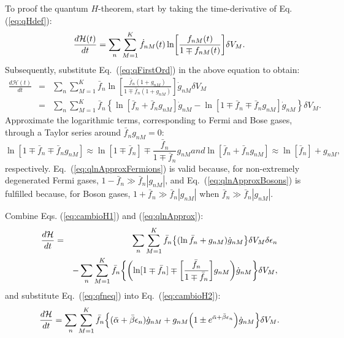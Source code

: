 To proof the quantum $H$-theorem, start by taking the time-derivative of Eq. (\ref{eq:qHdef}):
%
\begin{equation}\label{eq:deltaH}
   \frac{d \mathcal{H} (t)}{dt}= \sum_n \sum_{M=1}^{K} \dot{f}_{nM}(t)\ln \left[ \frac{f_{nM}(t)}{1\mp f_{nM}(t)} \right] \de V_M.
\end{equation}
%
Subsequently, substitute Eq.~(\ref{eq:qFirstOrd}) in the above equation to obtain:
%
\begin{eqnarray}\label{eq:cambioH1}
    \frac{d\mathcal{H} (t)}{dt}&=&
      \sum_n \sum_{M=1}^{K} \bar{f}_{n}\ln \left[
        \frac{\bar{f}_{n}(1+g_{nM})}{1\mp \bar{f}_{n} (1+ g_{nM})}
      \right]\dot{g}_{nM} \delta V_M \nonumber \\
    &=&\sum_n \sum_{M=1}^{K} \bar{f}_n \left \{
      \ln [\bar{f}_n+\bar{f}_n g_{nM}]\dot{g}_{nM}
      -\ln [1\mp\bar{f}_n\mp\bar{f}_n g_{nM}]\dot{g}_{nM}
    \right \}\delta V_M.
\end{eqnarray}
%
Approximate the logarithmic terms, corresponding to
Fermi and Bose gases, through a Taylor series around $\bar f_n g_{nM}=0$:
%
\begin{subequations}\label{eq:qlnApprox}
\begin{equation}\label{eq:qlnApproxFermions}
	\ln[1\mp\bar{f}_n\mp\bar{f}_n g_{nM}]
    	\approx \ln[1\mp\bar{f}_n]\mp\frac{\bar{f}_n}{1\mp\bar{f}_{n}} g_{nM}
\end{equation}
%
and
%
\begin{equation}\label{eq:qlnApproxBosons}
    \ln [\bar{f}_n+\bar{f}_n g_{nM}] \approx \ln [\bar{f}_n]+ g_{nM},
\end{equation}
\end{subequations}
%
respectively. Eq.~(\ref{eq:qlnApproxFermions}) is valid because, for non-extremely degenerated Fermi gases, 
$1-\bar{f}_n \gg \bar{f}_n|g_{nM}|$, and Eq.~(\ref{eq:qlnApproxBosons}) is fulfilled because,
for Boson gases,
$1+\bar{f}_n \gg \bar{f}_n |g_{nM}|$ when $\bar{f}_n \gg \bar{f}_n |g_{nM}|$.

Combine Eqs. (\ref{eq:cambioH1}) and (\ref{eq:qlnApprox}):
%
\begin{eqnarray}\label{eq:cambioH2}
    \frac{d\mathcal{H}}{dt}&=&\sum_n \sum_{M=1}^{K} \bar{f}_n\left \{ (\ln \bar{f}_n+ g_{nM})\dot{g}_{nM}\right\} \de V_M \delta \epsilon_n \nonumber \\
    &&-\sum_{n}\sum_{M=1}^{K}\bar f_n\left\{ \left( \ln[1\mp\bar{f}_n]\mp \left[\frac{\bar{f}_n}{1\mp\bar{f}_n} \right] g_{nM}\right)\dot{g}_{nM} \right \}\de V_M,
\end{eqnarray}
%
and substitute Eq.~(\ref{eq:qfneq}) into Eq.~(\ref{eq:cambioH2}):
%
\begin{equation}\label{eq:cambioH3}
    \frac{d\mathcal{H}}{dt}=
       \sum_n \sum_{M=1}^{K} \bar{f}_n\left \{
          (\bar{\alpha}+\bar{\beta}{\epsilon}_n)\dot{g}_{nM}
           +g_{nM}\left(1\pm e^{\bar{\alpha}+\bar{\beta}{\epsilon}_n}\right)\dot{g}_{nM}
       \right \} \de V_M.
\end{equation}
%

